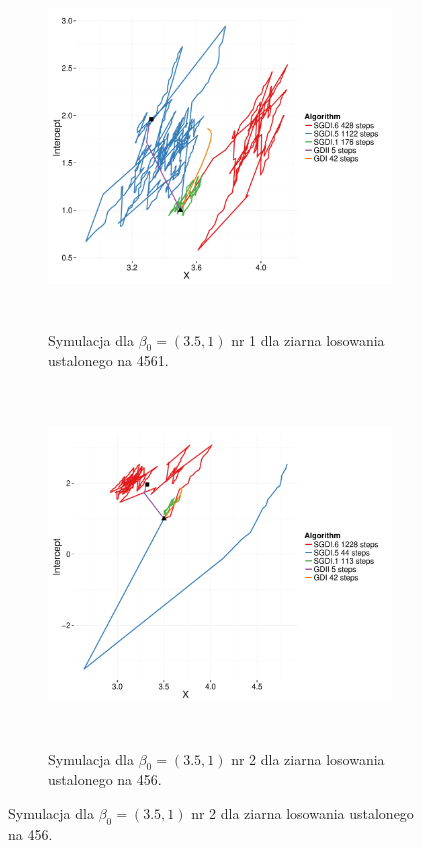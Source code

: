 \begin{figure}[hbt!]
  \begin{center}
   \begin{subfigure}[h!]{0.9\textwidth}
      \includegraphics[width=\textwidth, height=270pt]{Obrazki/sgd_35_1_1.pdf}
      \caption{Symulacja dla $\beta_0 = (3.5,1)$ nr 1 dla ziarna losowania ustalonego na 4561.}
   \end{subfigure}     
   \begin{subfigure}[h!]{0.9\textwidth}
      \includegraphics[width=\textwidth, height=270pt]{Obrazki/sgd_35_1_2.pdf}
      \caption{Symulacja dla $\beta_0 = (3.5,1)$ nr 2 dla ziarna losowania ustalonego na 456.}
   \end{subfigure}  \end{center}

\end{figure}
